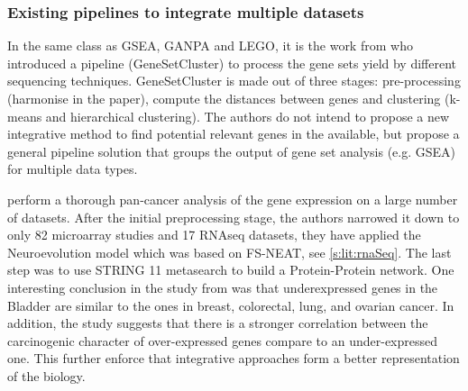 


\subsubsection*{Existing pipelines to integrate multiple datasets} \label{s:pipelines}


In the same class as GSEA, GANPA\cite{Fan2020-yb} and LEGO\cite{Dong2016-zs}, it is the work from \citet{Ewing2020-os} who introduced a pipeline (GeneSetCluster) to process the gene sets yield by different sequencing techniques. GeneSetCluster is made out of three stages: pre-processing (harmonise in the paper), compute the distances between genes and clustering (k-means and hierarchical clustering). The authors do not intend to propose a new integrative method to find potential relevant genes in the available, but propose a general pipeline solution that groups the output of gene set analysis (e.g. GSEA) for multiple data types.

\citet{Feltes2020-bz} perform a thorough pan-cancer analysis of the gene expression on a large number of datasets. After the initial preprocessing stage, the authors narrowed it down to only 82 microarray studies and 17 RNAseq datasets, they have applied the Neuroevolution model\cite{Grisci2019-xn} which was based on FS-NEAT\cite{Whiteson2005-dn}, see \cref{s:lit:rnaSeq}. The last step was to use STRING 11\cite{Szklarczyk2019-pu} metasearch to build a Protein-Protein network. One interesting conclusion in the study from \cite{Feltes2020-bz} was that underexpressed genes in the Bladder are similar to the ones in breast, colorectal, lung, and ovarian cancer. In addition, the study suggests that there is a stronger correlation between the carcinogenic character of over-expressed genes compare to an under-expressed one. This further enforce that integrative approaches form a better representation of the biology.

